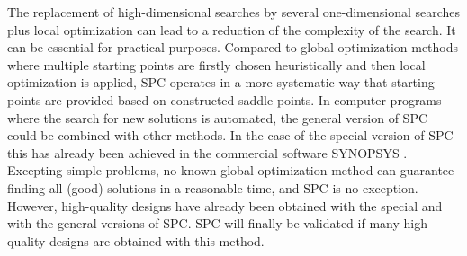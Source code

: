 The replacement of high-dimensional searches by several one-dimensional searches plus local optimization can lead to a reduction of the complexity of the search. It can be essential for practical purposes. Compared to global optimization methods where multiple starting points are firstly chosen heuristically and then local optimization is applied, SPC operates in a more systematic way that starting points are provided based on constructed saddle points. In computer programs where the search for new solutions is automated, the general version of SPC could be combined with other methods. In the case of the special version of SPC this has already been achieved in the commercial software SYNOPSYS \cite{DilworthSP2012}. Excepting simple problems, no known global optimization method can guarantee finding all (good) solutions in a reasonable time, and SPC is no exception. However, high-quality designs have already been obtained with the special \cite{MarinescuSP2008}\cite{BociortPatent2010} and with the general versions \cite{LivshitsSP2014} of SPC. SPC will finally be validated if many high-quality designs are obtained with this method.




